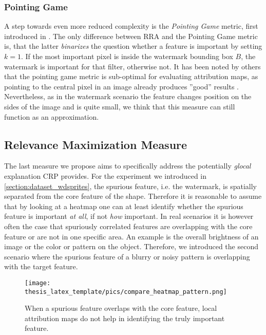\subsubsection{Pointing Game}
A step towards even more reduced complexity is the \textit{Pointing Game} metric, first introduced in \cite{Zhang2016}. The only difference between RRA and the Pointing Game metric is, that the latter \textit{binarizes} the question whether a feature is important by setting $k = 1$. If the most important pixel is inside the watermark bounding box $B$, the watermark is important for that filter, otherwise not.
It has been noted by others that the pointing game metric is sub-optimal for evaluating attribution maps, as pointing to the central pixel in an image already produces ''good'' results \cite{Gu2019}. Nevertheless, as in the watermark scenario the feature changes position on the sides of the image and is quite small, we think that this measure can still function as an approximation. 

\subsection{Relevance Maximization Measure}\label{section:relmax_measure}
The last measure we propose aims to specifically address the potentially \textit{glocal} explanation CRP provides. For the experiment we introduced in \cref{section:dataset_wdsprites}, the spurious feature, i.e. the watermark, is spatially separated from the core feature of the shape. Therefore it is reasonable to assume that by looking at a heatmap one can at least identify whether the spurious feature is important \textit{at all}, if not \textit{how} important. 
In real scenarios it is however often the case that spuriously correlated features are overlapping with the core feature or are not in one specific area. An example is the overall brightness of an image or the color or pattern on the object. Therefore, we introduced the second scenario where the spurious feature of a blurry or noisy pattern is overlapping with the target feature.

\begin{figure}[t!]
    \centering
    \texttt{[image: thesis\_latex\_template/pics/compare\_heatmap\_pattern.png]}
    \caption[Distinguish heatmaps for different patterns]{When a spurious feature overlaps with the core feature, local attribution maps do not help in identifying the truly important feature.}
    \label{fig:compare_heatmap_pattern}
\end{figure}

